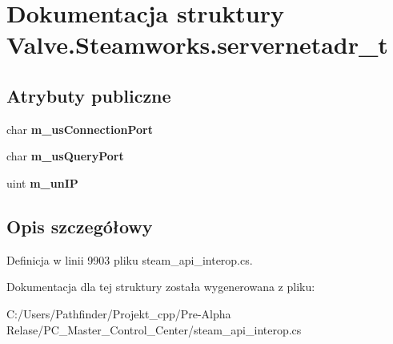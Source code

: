 \hypertarget{struct_valve_1_1_steamworks_1_1servernetadr__t}{}\section{Dokumentacja struktury Valve.\+Steamworks.\+servernetadr\+\_\+t}
\label{struct_valve_1_1_steamworks_1_1servernetadr__t}
\subsection*{Atrybuty publiczne}
\begin{DoxyCompactItemize}
\item 
\mbox{\label{struct_valve_1_1_steamworks_1_1servernetadr__t_aa6b590f643f43034f35676e4550227fb}} 
char {\bfseries m\+\_\+us\+Connection\+Port}
\item 
\mbox{\label{struct_valve_1_1_steamworks_1_1servernetadr__t_afac6fcb498d5352ca0ba51be5f5c274e}} 
char {\bfseries m\+\_\+us\+Query\+Port}
\item 
\mbox{\label{struct_valve_1_1_steamworks_1_1servernetadr__t_a4987287d5cbbfe24cd922bf96ec7c79d}} 
uint {\bfseries m\+\_\+un\+IP}
\end{DoxyCompactItemize}


\subsection{Opis szczegółowy}


Definicja w linii 9903 pliku steam\+\_\+api\+\_\+interop.\+cs.



Dokumentacja dla tej struktury została wygenerowana z pliku\+:\begin{DoxyCompactItemize}
\item 
C\+:/\+Users/\+Pathfinder/\+Projekt\+\_\+cpp/\+Pre-\/\+Alpha Relase/\+P\+C\+\_\+\+Master\+\_\+\+Control\+\_\+\+Center/steam\+\_\+api\+\_\+interop.\+cs\end{DoxyCompactItemize}
